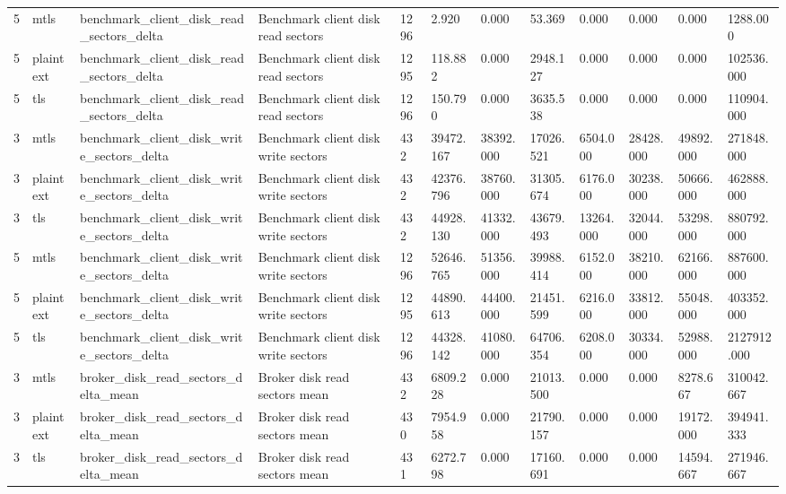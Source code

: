 \begin{longtable}{llllllllllll}
5 & mtls & benchmark\_client\_disk\_read\_sectors\_delta & Benchmark client disk read sectors & 1296 & 2.920 & 0.000 & 53.369 & 0.000 & 0.000 & 0.000 & 1288.000 \\
5 & plaintext & benchmark\_client\_disk\_read\_sectors\_delta & Benchmark client disk read sectors & 1295 & 118.882 & 0.000 & 2948.127 & 0.000 & 0.000 & 0.000 & 102536.000 \\
5 & tls & benchmark\_client\_disk\_read\_sectors\_delta & Benchmark client disk read sectors & 1296 & 150.790 & 0.000 & 3635.538 & 0.000 & 0.000 & 0.000 & 110904.000 \\
3 & mtls & benchmark\_client\_disk\_write\_sectors\_delta & Benchmark client disk write sectors & 432 & 39472.167 & 38392.000 & 17026.521 & 6504.000 & 28428.000 & 49892.000 & 271848.000 \\
3 & plaintext & benchmark\_client\_disk\_write\_sectors\_delta & Benchmark client disk write sectors & 432 & 42376.796 & 38760.000 & 31305.674 & 6176.000 & 30238.000 & 50666.000 & 462888.000 \\
3 & tls & benchmark\_client\_disk\_write\_sectors\_delta & Benchmark client disk write sectors & 432 & 44928.130 & 41332.000 & 43679.493 & 13264.000 & 32044.000 & 53298.000 & 880792.000 \\
5 & mtls & benchmark\_client\_disk\_write\_sectors\_delta & Benchmark client disk write sectors & 1296 & 52646.765 & 51356.000 & 39988.414 & 6152.000 & 38210.000 & 62166.000 & 887600.000 \\
5 & plaintext & benchmark\_client\_disk\_write\_sectors\_delta & Benchmark client disk write sectors & 1295 & 44890.613 & 44400.000 & 21451.599 & 6216.000 & 33812.000 & 55048.000 & 403352.000 \\
5 & tls & benchmark\_client\_disk\_write\_sectors\_delta & Benchmark client disk write sectors & 1296 & 44328.142 & 41080.000 & 64706.354 & 6208.000 & 30334.000 & 52988.000 & 2127912.000 \\
3 & mtls & broker\_disk\_read\_sectors\_delta\_mean & Broker disk read sectors mean & 432 & 6809.228 & 0.000 & 21013.500 & 0.000 & 0.000 & 8278.667 & 310042.667 \\
3 & plaintext & broker\_disk\_read\_sectors\_delta\_mean & Broker disk read sectors mean & 430 & 7954.958 & 0.000 & 21790.157 & 0.000 & 0.000 & 19172.000 & 394941.333 \\
3 & tls & broker\_disk\_read\_sectors\_delta\_mean & Broker disk read sectors mean & 431 & 6272.798 & 0.000 & 17160.691 & 0.000 & 0.000 & 14594.667 & 271946.667 \\

\end{longtable}
